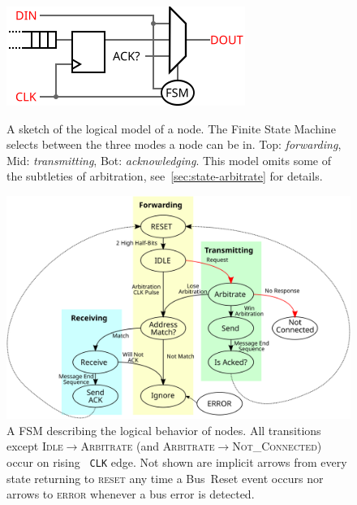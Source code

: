 \begin{figure}[h]
  \begin{minipage}[b]{.48\linewidth}
    \centering
    \includegraphics[width=\textwidth]{img/logical}
    \caption{A sketch of the logical model of a node. The Finite State Machine
  selects between the three modes a node can be in. Top: {\em forwarding}, Mid:
  {\em transmitting}, Bot: {\em acknowledging}. This model omits some of the
  subtleties of arbitration, see~\ref{sec:state-arbitrate} for details.
    }
    \label{fig:logical}
  \end{minipage}
  \hspace{1 em}
  \begin{minipage}[b]{.48\linewidth}
    \centering
    \label{fig:states}
  \end{minipage}
\end{figure}

\begin{figure}[h]
  \includegraphics[width=\linewidth]{img/fsm_diagram}
  \caption{A FSM describing the logical behavior of \bus nodes. All
transitions except \textsc{Idle}$\rightarrow$\textsc{Arbitrate} (and
\textsc{Arbitrate}$\rightarrow$\textsc{Not\_Connected}) occur on rising {\tt
CLK} edge. Not shown are implicit arrows from every state returning to
\textsc{reset} any time a Bus~Reset event occurs nor arrows to \textsc{error}
whenever a bus error is detected.
}
\end{figure}


